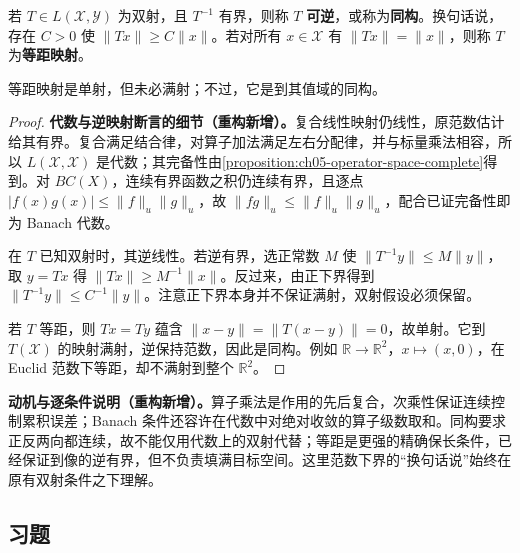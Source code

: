 \documentclass[../../main.tex]{subfiles}
\begin{document}
\begin{definition}\label{definition:ch05-isomorphism-isometry}
若 $T\in L(\mathcal X,\mathcal Y)$ 为双射，且 $T^{-1}$ 有界，则称 $T$ \textbf{可逆}，或称为\textbf{同构}。换句话说，存在 $C>0$ 使 $\|Tx\|\ge C\|x\|$。若对所有 $x\in\mathcal X$ 有 $\|Tx\|=\|x\|$，则称 $T$ 为\textbf{等距映射}。
\end{definition}
等距映射是单射，但未必满射；不过，它是到其值域的同构。
\begin{proof}
\textbf{代数与逆映射断言的细节（重构新增）。}复合线性映射仍线性，原范数估计给其有界。复合满足结合律，对算子加法满足左右分配律，并与标量乘法相容，所以 $L(\mathcal X,\mathcal X)$ 是代数；其完备性由\cref{proposition:ch05-operator-space-complete}得到。对 $BC(X)$，连续有界函数之积仍连续有界，且逐点 $|f(x)g(x)|\le\|f\|_u\|g\|_u$，故 $\|fg\|_u\le\|f\|_u\|g\|_u$，配合已证完备性即为 Banach 代数。

在 $T$ 已知双射时，其逆线性。若逆有界，选正常数 $M$ 使 $\|T^{-1}y\|\le M\|y\|$，取 $y=Tx$ 得 $\|Tx\|\ge M^{-1}\|x\|$。反过来，由正下界得到 $\|T^{-1}y\|\le C^{-1}\|y\|$。注意正下界本身并不保证满射，双射假设必须保留。

若 $T$ 等距，则 $Tx=Ty$ 蕴含 $\|x-y\|=\|T(x-y)\|=0$，故单射。它到 $T(\mathcal X)$ 的映射满射，逆保持范数，因此是同构。例如 $\mathbb R\to\mathbb R^2$，$x\mapsto(x,0)$，在 Euclid 范数下等距，却不满射到整个 $\mathbb R^2$。
\end{proof}
\begin{remark}
\textbf{动机与逐条件说明（重构新增）。}算子乘法是作用的先后复合，次乘性保证连续控制累积误差；Banach 条件还容许在代数中对绝对收敛的算子级数取和。同构要求正反两向都连续，故不能仅用代数上的双射代替；等距是更强的精确保长条件，已经保证到像的逆有界，但不负责填满目标空间。这里范数下界的“换句话说”始终在原有双射条件之下理解。
\end{remark}
\subsection*{习题}

\end{document}

